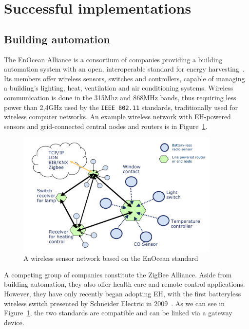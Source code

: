 \documentclass[a4paper,10pt]{article}
\begin{document}
\section{Successful implementations}

\subsection{Building automation}

The EnOcean Alliance is a consortium of companies providing a building automation system with an open, interoperable standard for energy harvesting~\cite{enocean}. Its members offer wireless sensors, switches and controllers, capable of managing a building's lighting, heat, ventilation and air conditioning systems. Wireless communication is done in the 315Mhz and 868MHz bands, thus requiring less power than 2,4GHz used by the \texttt{IEEE 802.11} standards, traditionally used for wireless computer networks. An example wireless network with \ac{EH}-powered sensors and grid-connected central nodes and routers is in Figure~\ref{fig:enocean-shema}. 

\begin{figure}[h]
\centering
 \includegraphics[width=0.9\textwidth]{./Slike/EnOcean-shema}
\caption{A wireless sensor network based on the EnOcean standard~\cite{enocean}}
\label{fig:enocean-shema}
\end{figure}

A competing group of companies constitute the ZigBee Alliance. Aside from building automation, they also offer health care and remote control applications. However, they have only recently began adopting \ac{EH}, with the first batteryless wireless switch presented by Schneider Electric in 2009~\cite{schneider-zb}. As we can see in Figure~\ref{fig:enocean-shema}, the two standards are compatible and can be linked via a gateway device. 
\end{document}
